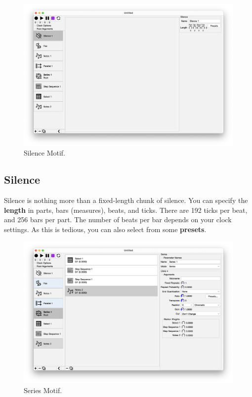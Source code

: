 \documentclass[twoside,10pt]{article}
\begin{document}
\clearpage

\begin{figure}[t]
\centering
\includegraphics[width=6.5in]{Silence}
\vspace{-2em}
\caption{Silence Motif.}
\label{silence}
\end{figure}

\subsection{Silence}

Silence is nothing more than a fixed-length chunk of silence.    You can specify the {\bf length} in parts, bars (measures), beats, and ticks.  There are 192 ticks per beat, and 256 bars per part.  The number of beats per bar depends on your clock settings.  As this is tedious, you can also select from some {\bf presets}.

\clearpage

\begin{figure}[t]
\centering
\includegraphics[width=6.5in]{Series}
\vspace{-2em}
\caption{Series Motif.}
\label{series}
\end{figure}
\end{document}
